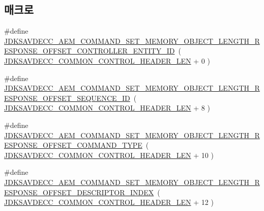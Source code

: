\subsection*{매크로}
\begin{DoxyCompactItemize}
\item 
\#define \hyperlink{group__command__set__memory__object__length__response_ga7a3c611929add96f75f887f95481cba7}{J\+D\+K\+S\+A\+V\+D\+E\+C\+C\+\_\+\+A\+E\+M\+\_\+\+C\+O\+M\+M\+A\+N\+D\+\_\+\+S\+E\+T\+\_\+\+M\+E\+M\+O\+R\+Y\+\_\+\+O\+B\+J\+E\+C\+T\+\_\+\+L\+E\+N\+G\+T\+H\+\_\+\+R\+E\+S\+P\+O\+N\+S\+E\+\_\+\+O\+F\+F\+S\+E\+T\+\_\+\+C\+O\+N\+T\+R\+O\+L\+L\+E\+R\+\_\+\+E\+N\+T\+I\+T\+Y\+\_\+\+ID}~( \hyperlink{group__jdksavdecc__avtp__common__control__header_gaae84052886fb1bb42f3bc5f85b741dff}{J\+D\+K\+S\+A\+V\+D\+E\+C\+C\+\_\+\+C\+O\+M\+M\+O\+N\+\_\+\+C\+O\+N\+T\+R\+O\+L\+\_\+\+H\+E\+A\+D\+E\+R\+\_\+\+L\+EN} + 0 )
\item 
\#define \hyperlink{group__command__set__memory__object__length__response_ga0ccee44b5cb35482c28f01c1c1efe8a6}{J\+D\+K\+S\+A\+V\+D\+E\+C\+C\+\_\+\+A\+E\+M\+\_\+\+C\+O\+M\+M\+A\+N\+D\+\_\+\+S\+E\+T\+\_\+\+M\+E\+M\+O\+R\+Y\+\_\+\+O\+B\+J\+E\+C\+T\+\_\+\+L\+E\+N\+G\+T\+H\+\_\+\+R\+E\+S\+P\+O\+N\+S\+E\+\_\+\+O\+F\+F\+S\+E\+T\+\_\+\+S\+E\+Q\+U\+E\+N\+C\+E\+\_\+\+ID}~( \hyperlink{group__jdksavdecc__avtp__common__control__header_gaae84052886fb1bb42f3bc5f85b741dff}{J\+D\+K\+S\+A\+V\+D\+E\+C\+C\+\_\+\+C\+O\+M\+M\+O\+N\+\_\+\+C\+O\+N\+T\+R\+O\+L\+\_\+\+H\+E\+A\+D\+E\+R\+\_\+\+L\+EN} + 8 )
\item 
\#define \hyperlink{group__command__set__memory__object__length__response_ga24612c2a9ac9332e20fb6e80746e9a34}{J\+D\+K\+S\+A\+V\+D\+E\+C\+C\+\_\+\+A\+E\+M\+\_\+\+C\+O\+M\+M\+A\+N\+D\+\_\+\+S\+E\+T\+\_\+\+M\+E\+M\+O\+R\+Y\+\_\+\+O\+B\+J\+E\+C\+T\+\_\+\+L\+E\+N\+G\+T\+H\+\_\+\+R\+E\+S\+P\+O\+N\+S\+E\+\_\+\+O\+F\+F\+S\+E\+T\+\_\+\+C\+O\+M\+M\+A\+N\+D\+\_\+\+T\+Y\+PE}~( \hyperlink{group__jdksavdecc__avtp__common__control__header_gaae84052886fb1bb42f3bc5f85b741dff}{J\+D\+K\+S\+A\+V\+D\+E\+C\+C\+\_\+\+C\+O\+M\+M\+O\+N\+\_\+\+C\+O\+N\+T\+R\+O\+L\+\_\+\+H\+E\+A\+D\+E\+R\+\_\+\+L\+EN} + 10 )
\item 
\#define \hyperlink{group__command__set__memory__object__length__response_ga6890fad23c43d12a05e2c1f154304401}{J\+D\+K\+S\+A\+V\+D\+E\+C\+C\+\_\+\+A\+E\+M\+\_\+\+C\+O\+M\+M\+A\+N\+D\+\_\+\+S\+E\+T\+\_\+\+M\+E\+M\+O\+R\+Y\+\_\+\+O\+B\+J\+E\+C\+T\+\_\+\+L\+E\+N\+G\+T\+H\+\_\+\+R\+E\+S\+P\+O\+N\+S\+E\+\_\+\+O\+F\+F\+S\+E\+T\+\_\+\+D\+E\+S\+C\+R\+I\+P\+T\+O\+R\+\_\+\+I\+N\+D\+EX}~( \hyperlink{group__jdksavdecc__avtp__common__control__header_gaae84052886fb1bb42f3bc5f85b741dff}{J\+D\+K\+S\+A\+V\+D\+E\+C\+C\+\_\+\+C\+O\+M\+M\+O\+N\+\_\+\+C\+O\+N\+T\+R\+O\+L\+\_\+\+H\+E\+A\+D\+E\+R\+\_\+\+L\+EN} + 12 )

\end{DoxyCompactItemize}
